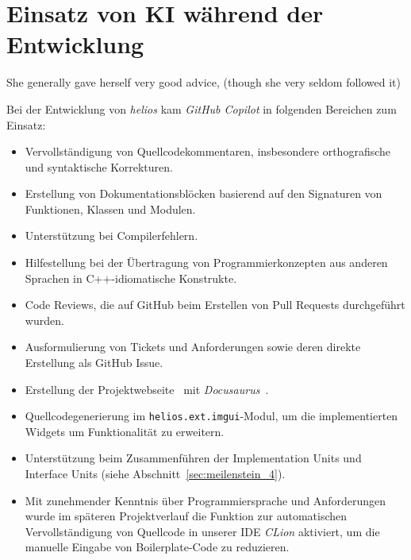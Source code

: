 \chapter{Einsatz von KI während der Entwicklung}\label{sec:ki}


\vspace{5mm}
\begin{displayquote}
    She generally gave herself very good advice, (though she very seldom followed it)
    \par\hfill\cite{Car65}
\end{displayquote}
\vspace{25mm}

Bei der Entwicklung von \textit{helios} kam \textit{GitHub Copilot} in folgenden Bereichen zum Einsatz:

\begin{itemize}
    \itemsep0.5em
    \item Vervollständigung von Quellcodekommentaren, insbesondere orthografische und syntaktische Korrekturen.
    \item Erstellung von Dokumentationsblöcken basierend auf den Signaturen von Funktionen, Klassen und Modulen.
    \item Unterstützung bei Compilerfehlern.
    \item Hilfestellung bei der Übertragung von Programmierkonzepten aus anderen Sprachen in C++-idiomatische Konstrukte.
    \item Code Reviews, die auf GitHub beim Erstellen von Pull Requests durchgeführt wurden.
    \item Ausformulierung von Tickets und Anforderungen sowie deren direkte Erstellung als GitHub Issue.
    \item Erstellung der Projektwebseite~\cite{HeliosProjectHome} mit \textit{Docusaurus}~\cite{docusaurus}.
    \item Quellcodegenerierung im \texttt{helios.ext.imgui}-Modul, um die implementierten Widgets um Funktionalität zu erweitern.
    \item Unterstützung beim Zusammenführen der Implementation Units und Interface Units (siehe Abschnitt~\ref{sec:meilenstein_4}).
    \item Mit zunehmender Kenntnis über Programmiersprache und Anforderungen wurde im späteren Projektverlauf die Funktion zur automatischen Vervollständigung von Quellcode in unserer IDE \textit{CLion} aktiviert, um die manuelle Eingabe von Boilerplate-Code zu reduzieren.
\end{itemize}


